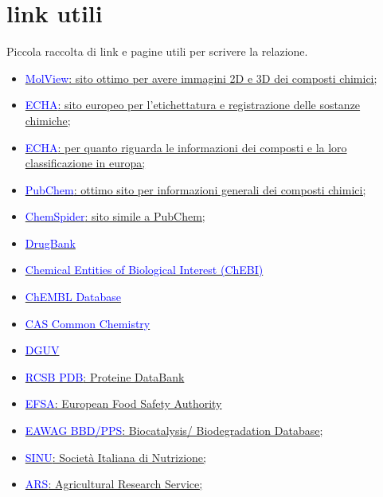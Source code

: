 \section*{link utili}

Piccola raccolta di link e pagine utili per scrivere la relazione.
\begin{footnotesize}
\begin{multicols}{2}
\begin{itemize}
    \item \href{https://molview.org/}{\textcolor{blue}{MolView}: sito ottimo per avere immagini 2D e 3D dei composti chimici;}
    \item \href{https://echa.europa.eu/it/regulations/clp/clp-pictograms}{\textcolor{blue}{ECHA}: sito europeo per l'etichettatura e registrazione delle sostanze chimiche;}
    \item \href{https://echa.europa.eu/it/information-on-chemicals/cl-inventory-database}{\textcolor{blue}{ECHA}: per quanto riguarda le informazioni dei composti e la loro classificazione in europa;}
    \item \href{https://pubchem.ncbi.nlm.nih.gov/}{\textcolor{blue}{PubChem}: ottimo sito per informazioni generali dei composti chimici;}
    \item \href{http://www.chemspider.com/}{\textcolor{blue}{ChemSpider}: sito simile a PubChem;}
    \item \href{https://go.drugbank.com/}{\textcolor{blue}{DrugBank}}
    \item \href{https://www.ebi.ac.uk/chebi/init.do}{\textcolor{blue}{Chemical Entities of Biological Interest (ChEBI)}}
    \item \href{https://www.ebi.ac.uk/chembl/}{\textcolor{blue}{ChEMBL Database}}
    \item \href{https://commonchemistry.cas.org/}{\textcolor{blue}{CAS Common Chemistry}}
    \item \href{https://dguv.de/corona/index.jsp}{\textcolor{blue}{DGUV}}
    \item \href{https://www.rcsb.org/}{\textcolor{blue}{RCSB PDB}: Proteine DataBank}
    \item \href{https://www.efsa.europa.eu/it}{\textcolor{blue}{EFSA}: European Food Safety Authority}
    \item \href{http://eawag-bbd.ethz.ch/}{\textcolor{blue}{EAWAG BBD/PPS}: Biocatalysis/ Biodegradation Database;}
    \item \href{https://sinu.it/}{\textcolor{blue}{SINU}: Società Italiana di Nutrizione;}
    \item \href{https://www.ars.usda.gov/}{\textcolor{blue}{ARS}: Agricultural Research Service;}

\end{itemize}
\end{multicols}
\end{footnotesize}
